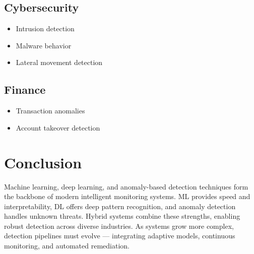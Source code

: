 \documentclass[12pt, draftclsnofoot, onecolumn]{IEEEtran}
\begin{document}
\subsection{Cybersecurity}
\begin{itemize}
\item Intrusion detection
\item Malware behavior
\item Lateral movement detection
\end{itemize}

\subsection{Finance}
\begin{itemize}
\item Transaction anomalies
\item Account takeover detection
\end{itemize}

\section{Conclusion}
Machine learning, deep learning, and anomaly-based detection techniques form the backbone of modern intelligent monitoring systems. ML provides speed and interpretability, DL offers deep pattern recognition, and anomaly detection handles unknown threats. Hybrid systems combine these strengths, enabling robust detection across diverse industries. As systems grow more complex, detection pipelines must evolve — integrating adaptive models, continuous monitoring, and automated remediation.
\end{document}
